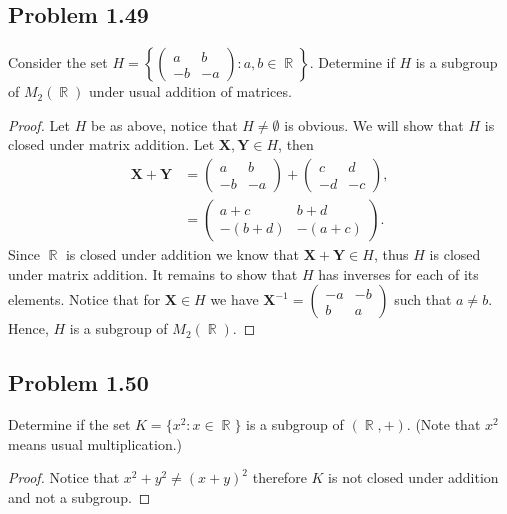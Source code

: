 \documentclass{amsbook}
\DeclareMathOperator{\R}{\mathbb{R}}
\begin{document}
			\subsection*{Problem 1.49}
			\label{sub:problem_1_49}
			Consider the set $H = \left\{ \begin{pmatrix} a & b \\ -b & -a \end{pmatrix} : a,b \in \R \right\}$.
			Determine if $H$ is a subgroup of $M_{2}(\R)$ under usual addition of matrices.
			\begin{proof} Let $H$ be as above, notice that $H \neq \emptyset$ is obvious.
			We will show that $H$ is closed under matrix addition.
			Let $\mathbf{X},\mathbf{Y} \in H$, then
				\begin{align*}
					\mathbf{X} + \mathbf{Y} &= \begin{pmatrix} a & b \\ -b & -a \end{pmatrix} + \begin{pmatrix} c & d \\ -d & -c \end{pmatrix}, \\
					&= \begin{pmatrix} a+c & b+d \\ -(b+d) & -(a+c) \end{pmatrix}.
				\end{align*}
			Since $\R$ is closed under addition we know that $\mathbf{X}+\mathbf{Y} \in H$, thus $H$ is closed under matrix addition.
			It remains to show that $H$ has inverses for each of its elements.
			Notice that for $\mathbf{X} \in H$ we have $\mathbf{X}^{-1} = \begin{pmatrix} -a & -b \\ b & a \end{pmatrix}$ such that $a \neq b$.
			Hence, $H$ is a subgroup of $M_{2}(\R)$.
			\end{proof}

			\subsection*{Problem 1.50}
			\label{sub:problem_1_50}
			Determine if the set $K = \{ x^{2} : x \in \R \}$ is a subgroup of $(\R, +)$. 
			(Note that $x^{2}$ means usual multiplication.)
			\begin{proof}
			Notice that $x^{2} + y^{2} \neq (x + y)^{2}$ therefore $K$ is not closed under addition and not a subgroup.
			\end{proof}
\end{document}
